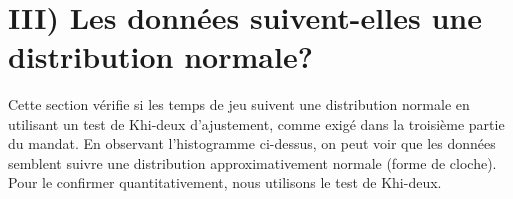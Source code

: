 \documentclass[11pt]{article}
\begin{document}
    \begin{center}
    \end{center}
    { \hspace*{\fill} \\}
    
    \section{III) Les données suivent-elles une distribution
normale?}\label{iii-les-donnuxe9es-suivent-elles-une-distribution-normale}

Cette section vérifie si les temps de jeu suivent une distribution
normale en utilisant un test de Khi-deux d'ajustement, comme exigé dans
la troisième partie du mandat. En observant l'histogramme ci-dessus, on
peut voir que les données semblent suivre une distribution
approximativement normale (forme de cloche). Pour le confirmer
quantitativement, nous utilisons le test de Khi-deux.
\end{document}
